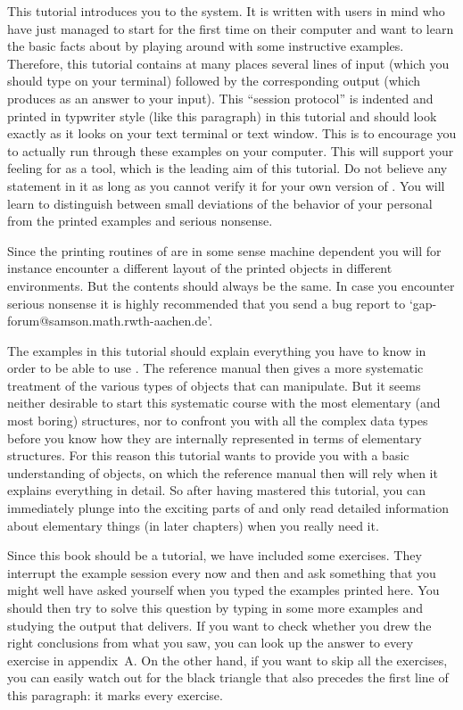 
This tutorial introduces you to  the {\GAP}  system.  It is written  with
users in mind who have just managed to start {\GAP} for the first time on
their computer and want to learn the basic facts  about {\GAP} by playing
around with some instructive  examples. Therefore, this tutorial contains
at many  places several lines of  input  (which you  should type  on your
terminal) followed by the corresponding output  (which {\GAP} produces as
an answer to your input).
\begintt
     This ``session protocol'' is indented and printed in typwriter style
     (like this paragraph) in this tutorial and should look exactly as it
     looks on your text terminal or text window.
\endtt
This is  to encourage you to actually  run through these examples on your
computer. This will support your  feeling for {\GAP}  as a tool, which is
the leading aim of this  tutorial. Do not believe any  statement in it as
long  as you cannot verify  it for your own  version of  {\GAP}. You will
learn to distinguish  between small  deviations of  the behavior of  your
personal {\GAP} from the printed examples and serious nonsense.

Since the printing routines of {\GAP} are in some sense machine dependent
you will for instance encounter a different layout of the printed objects
in different environments.  But the  contents should always be the  same.
In case you encounter serious nonsense  it is highly recommended that you
send a bug report to `gap-forum@samson.math.rwth-aachen.de'.

The examples in this tutorial should  explain everything you have to know
in order to be able to use {\GAP}. The reference manual then gives a more
systematic  treatment  of the various types   of  objects that {\GAP} can
manipulate. But   it seems  neither desirable   to  start this systematic
course with the  most elementary  (and  most boring) structures, nor   to
confront you with all the complex data types before you know how they are
internally represented in terms of elementary structures. For this reason
this  tutorial wants to provide you  with a basic understanding of {\GAP}
objects, on which  the reference manual  then will rely  when it explains
everything in  detail.  So after having mastered   this tutorial, you can
immediately  plunge into  the exciting   parts of  {\GAP} and only   read
detailed information about elementary things (in later chapters) when you
really need it.

\fmark Since  this  book  should be a   tutorial,  we have  included some
exercises. They interrupt the example session every  now and then and ask
something that  you might well  have  asked yourself when you  typed  the
examples  printed here.  You should then  try to  solve this  question by
typing  in  some more   examples  and studying  the output    that {\GAP}
delivers. If  you want  to check  whether you  drew the right conclusions
from what you  saw,  you can  look up  the answer  to every   exercise in
appendix~A\null.   On the other   hand, if  you  want   to  skip all  the
exercises, you can   easily watch out for   the black triangle  that also
precedes the first line of this paragraph: it marks every exercise.

